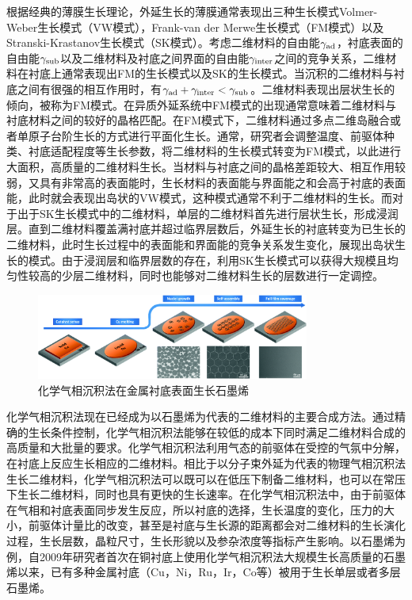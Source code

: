     根据经典的薄膜生长理论，外延生长的薄膜通常表现出三种生长模式\chinesecolon Volmer-Weber生长模式（VW模式），Frank-van der Merwe生长模式（FM模式）以及Stranski-Krastanov生长模式（SK模式）。考虑二维材料的自由能$\gamma_{\rm ad}$，衬底表面的自由能$\gamma_{\rm sub}$以及二维材料及衬底之间界面的自由能$\gamma_{\rm inter}$之间的竞争关系，二维材料在衬底上通常表现出FM的生长模式以及SK的生长模式。当沉积的二维材料与衬底之间有很强的相互作用时，有$\gamma_{\rm ad}+\gamma_{\rm inter}<\gamma_{\rm sub}$。二维材料表现出层状生长的倾向，被称为FM模式。在异质外延系统中FM模式的出现通常意味着二维材料与衬底材料之间的较好的晶格匹配。在FM模式下，二维材料通过多点二维岛融合或者单原子台阶生长的方式进行平面化生长。通常，研究者会调整温度、前驱体种类、衬底适配程度等生长参数，将二维材料的生长模式转变为FM模式，以此进行大面积，高质量的二维材料生长。当材料与衬底之间的晶格差距较大、相互作用较弱，又具有非常高的表面能时，生长材料的表面能与界面能之和会高于衬底的表面能，此时就会表现出岛状的VW模式，这种模式通常不利于二维材料的生长。而对于出于SK生长模式中的二维材料，单层的二维材料首先进行层状生长，形成浸润层。直到二维材料覆盖满衬底并超过临界层数后，外延生长的衬底转变为已生长的二维材料，此时生长过程中的表面能和界面能的竞争关系发生变化，展现出岛状生长的模式。由于浸润层和临界层数的存在，利用SK生长模式可以获得大规模且均匀性较高的少层二维材料，同时也能够对二维材料生长的层数进行一定调控。

    \begin{figure}[htb]
        \includegraphics[width=0.8\textwidth]{pic/INTRO_CVD_graphene_growth.png}
        \caption{化学气相沉积法在金属衬底表面生长石墨烯}
        \label{}
    \end{figure}

    化学气相沉积法现在已经成为以石墨烯为代表的二维材料的主要合成方法。通过精确的生长条件控制，化学气相沉积法能够在较低的成本下同时满足二维材料合成的高质量和大批量的要求。化学气相沉积法利用气态的前驱体在受控的气氛中分解，在衬底上反应生长相应的二维材料。相比于以分子束外延为代表的物理气相沉积法生长二维材料，化学气相沉积法可以既可以在低压下制备二维材料，也可以在常压下生长二维材料，同时也具有更快的生长速率。在化学气相沉积法中，由于前驱体在气相和衬底表面同步发生反应，所以衬底的选择，生长温度的变化，压力的大小，前驱体计量比的改变，甚至是衬底与生长源的距离都会对二维材料的生长演化过程，生长层数，晶粒尺寸，生长形貌以及参杂浓度等指标产生影响。以石墨烯为例，自2009年研究者首次在铜衬底上使用化学气相沉积法大规模生长高质量的石墨烯以来，已有多种金属衬底（Cu，Ni，Ru，Ir，Co等）被用于生长单层或者多层石墨烯。

